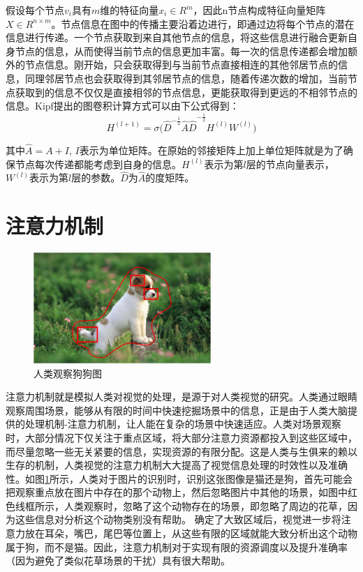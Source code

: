 假设每个节点$v_i$具有$m$维的特征向量$x_i\in R^m$，因此n节点构成特征向量矩阵$X\in R^{n\times m}$。节点信息在图中的传播主要沿着边进行，即通过边将每个节点的潜在信息进行传递。一个节点获取到来自其他节点的信息，将这些信息进行融合更新自身节点的信息，从而使得当前节点的信息更加丰富。每一次的信息传递都会增加额外的节点信息。刚开始，只会获取得到与当前节点直接相连的其他邻居节点的信息，同理邻居节点也会获取得到其邻居节点的信息，随着传递次数的增加，当前节点获取到的信息不仅仅是直接相邻的节点信息，更能获取得到更远的不相邻节点的信息。Kipf提出的图卷积计算方式可以由下公式得到：
\begin{equation}\label{GNNFormula1}
	H^{\left(l+1\right)}=\sigma{{(\hat{D}}^{-\frac{1}{2}}\hat{A}\hat{D}}^{-\frac{1}{2}}H^{\left(l\right)}W^{\left(l\right)})
\end{equation}

其中$\hat{A}=A+I$, $I$表示为单位矩阵。在原始的邻接矩阵上加上单位矩阵就是为了确保节点每次传递都能考虑到自身的信息。$H^{\left(l\right)}$表示为第$l$层的节点向量表示，$W^{\left(l\right)}$表示为第$l$层的参数。$\hat{D}$为$\hat{A}$的度矩阵。

\section{注意力机制}
\begin{figure}[htb]%
	\setlength{\belowcaptionskip}{0pt}
	\centering
	\includegraphics[width=0.6\textwidth]{pic/2-9.png}
	\caption{人类观察狗狗图}
	\label{watchDog}
\end{figure}
注意力机制就是模拟人类对视觉的处理，是源于对人类视觉的研究。人类通过眼睛观察周围场景，能够从有限的时间中快速挖掘场景中的信息，正是由于人类大脑提供的处理机制-注意力机制，让人能在复杂的场景中快速适应。人类对场景观察时，大部分情况下仅关注于重点区域，将大部分注意力资源都投入到这些区域中，而尽量忽略一些无关紧要的信息，实现资源的有限分配。这是人类与生俱来的赖以生存的机制，人类视觉的注意力机制大大提高了视觉信息处理的时效性以及准确性。如图\ref{watchDog}所示，人类对于图片的识别时，识别这张图像是猫还是狗，首先可能会把观察重点放在图片中存在的那个动物上，然后忽略图片中其他的场景，如图中红色线框所示，人类观察时，忽略了这个动物存在的场景，即忽略了周边的花草，因为这些信息对分析这个动物类别没有帮助。
确定了大致区域后，视觉进一步将注意力放在耳朵，嘴巴，尾巴等位置上，从这些有限的区域就能大致分析出这个动物属于狗，而不是猫。因此，注意力机制对于实现有限的资源调度以及提升准确率（因为避免了类似花草场景的干扰）具有很大帮助。

